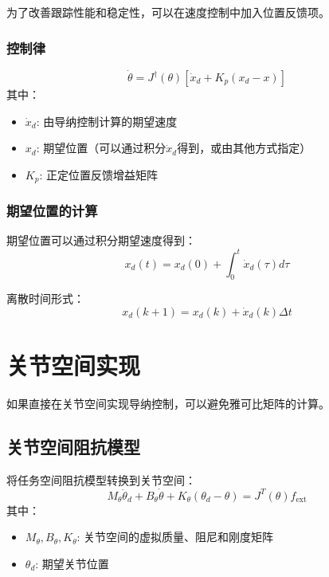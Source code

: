 \documentclass[12pt,a4paper]{article}
\begin{document}
为了改善跟踪性能和稳定性，可以在速度控制中加入位置反馈项。

\subsubsection{控制律}

\begin{equation}
\dot{\theta} = J^{\dagger}(\theta)\left[\dot{x}_d + K_p(x_d - x)\right]
\end{equation}
其中：
\begin{itemize}
\item $\dot{x}_d$: 由导纳控制计算的期望速度
\item $x_d$: 期望位置（可以通过积分$\dot{x}_d$得到，或由其他方式指定）
\item $K_p$: 正定位置反馈增益矩阵
\end{itemize}

\subsubsection{期望位置的计算}

期望位置可以通过积分期望速度得到：
\begin{equation}
x_d(t) = x_d(0) + \int_0^t \dot{x}_d(\tau) d\tau
\end{equation}

离散时间形式：
\begin{equation}
x_d(k+1) = x_d(k) + \dot{x}_d(k) \Delta t
\end{equation}

\section{关节空间实现}

如果直接在关节空间实现导纳控制，可以避免雅可比矩阵的计算。

\subsection{关节空间阻抗模型}

将任务空间阻抗模型转换到关节空间：
\begin{equation}
M_{\theta}\ddot{\theta}_d + B_{\theta}\dot{\theta} + K_{\theta}(\theta_d - \theta) = J^T(\theta) f_{\text{ext}}
\end{equation}
其中：
\begin{itemize}
\item $M_{\theta}, B_{\theta}, K_{\theta}$: 关节空间的虚拟质量、阻尼和刚度矩阵
\item $\theta_d$: 期望关节位置
\end{itemize}
\end{document}
